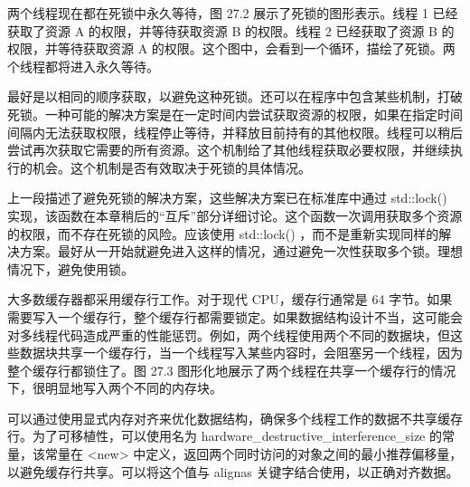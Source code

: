 两个线程现在都在死锁中永久等待，图 27.2 展示了死锁的图形表示。线程 1 已经获取了资源 A 的权限，并等待获取资源 B 的权限。线程 2 已经获取了资源 B 的权限，并等待获取资源 A 的权限。这个图中，会看到一个循环，描绘了死锁。两个线程都将进入永久等待。


最好是以相同的顺序获取，以避免这种死锁。还可以在程序中包含某些机制，打破死锁。一种可能的解决方案是在一定时间内尝试获取资源的权限，如果在指定时间间隔内无法获取权限，线程停止等待，并释放目前持有的其他权限。线程可以稍后尝试再次获取它需要的所有资源。这个机制给了其他线程获取必要权限，并继续执行的机会。这个机制是否有效取决于死锁的具体情况。

上一段描述了避免死锁的解决方案，这些解决方案已在标准库中通过 std::lock() 实现，该函数在本章稍后的“互斥”部分详细讨论。这个函数一次调用获取多个资源的权限，而不存在死锁的风险。应该使用 std::lock() ，而不是重新实现同样的解决方案。最好从一开始就避免进入这样的情况，通过避免一次性获取多个锁。理想情况下，避免使用锁。


大多数缓存器都采用缓存行工作。对于现代 CPU，缓存行通常是 64 字节。如果需要写入一个缓存行，整个缓存行都需要锁定。如果数据结构设计不当，这可能会对多线程代码造成严重的性能惩罚。例如，两个线程使用两个不同的数据块，但这些数据块共享一个缓存行，当一个线程写入某些内容时，会阻塞另一个线程，因为整个缓存行都锁住了。图 27.3 图形化地展示了两个线程在共享一个缓存行的情况下，很明显地写入两个不同的内存块。


可以通过使用显式内存对齐来优化数据结构，确保多个线程工作的数据不共享缓存行。为了可移植性，可以使用名为 hardware\_destructive\_interference\_size 的常量，该常量在 <new> 中定义，返回两个同时访问的对象之间的最小推荐偏移量，以避免缓存行共享。可以将这个值与 alignas 关键字结合使用，以正确对齐数据。







